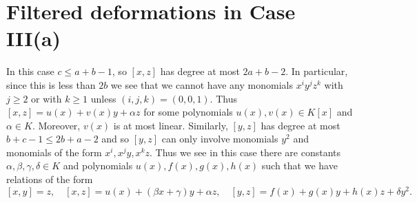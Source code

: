 \documentclass[a4paper,11pt,twoside,notitlepage,reqno]{amsart}
\theoremstyle{plain}
\numberwithin{thm}{section}
\theoremstyle{definition}
\begin{document}
\section{Filtered deformations in Case III(a)}\label{sec:IIIa}
In this case $c\le a+b-1$, so $[x,z]$ has degree at most $2a+b-2$. In particular, since this is less than $2b$ we see that we cannot have any monomials $x^i y^j z^k$ with $j\ge 2$ or with $k\ge 1$ unless $(i,j,k)=(0,0,1)$. Thus 
$[x,z]= u(x) +v(x) y + \alpha z$ for some polynomials $u(x), v(x)\in K[x]$ and $\alpha\in K$. Moreover, $v(x)$ is at most linear. Similarly, 
$[y,z]$ has degree at most $b+c-1\le 2b+a-2$ and so $[y,z]$ can only involve monomials $y^2$ and monomials of the form $x^i, x^j y, x^k z$.
Thus we see in this case there are constants $\alpha,\beta,\gamma,\delta \in K$ and polynomials $u(x), f(x), g(x), h(x)$
such that we have relations of the form
$$[x,y]=z, \quad [x,z] = u(x) + (\beta x+\gamma)y + \alpha z, \quad [y,z]=f(x)+g(x)y + h(x)z+\delta y^2.$$
\end{document}
